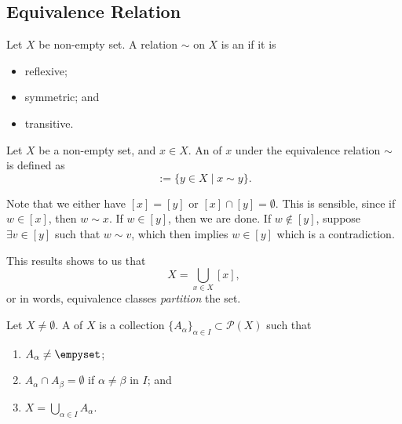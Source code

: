 \documentclass[notoc,notitlepage]{tufte-book}
\begin{document}
\subsection{Equivalence Relation}%
\label{sub:equivalence_relation}

\begin{defn}
\label{defn:equivalence_relation}
  Let $X$ be non-empty set. A relation $\sim$ on $X$ is an  if it is
  \begin{itemize}
    \item reflexive; 
    \item symmetric; and
    \item transitive.
  \end{itemize}
\end{defn}

\begin{defn}
\label{defn:equivalence_class}
  Let $X$ be a non-empty set, and $x \in X$. An  of $x$ under the equivalence relation $\sim$ is defined as
  \begin{equation*}
    [x] := \{ y \in X \mid x \sim y \}.
  \end{equation*}
\end{defn}

\begin{note}
  Note that we either have $[x] = [y]$ or $[x] \cap [y] = \emptyset$. This is sensible, since if $w \in [x]$, then $w \sim x$. If $w \in [y]$, then we are done. If $w \notin [y]$, suppose $\exists v \in [y]$ such that $w \sim v$, which then implies $w \in [y]$ which is a contradiction.

  This results shows to us that
  \begin{equation*}
    X = \bigcup_{x \in X} [x],
  \end{equation*}
  or in words, equivalence classes \textit{partition} the set.
\end{note}

\begin{defn}[Partition]
\label{defn:partition}
  Let $X \neq \emptyset$. A  of $X$ is a collection $\{A_{\alpha} \}_{\alpha \in I} \subset \mathcal{P}(X)$ such that
  \begin{enumerate}
    \item $A_\alpha \neq \empyset$;
    \item $A_{\alpha} \cap A_{\beta} = \emptyset$ if $\alpha \neq \beta$ in $I$; and
    \item $X = \bigcup_{\alpha \in I} A_\alpha$.
  \end{enumerate}
\end{defn}
\end{document}
